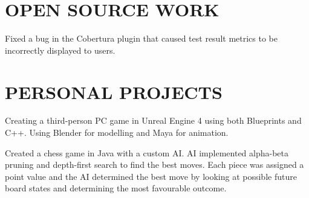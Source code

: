 \documentclass[letterpaper]{deedy-resume-modified} %
\begin{document}
\begin{minipage}[t]{0.66\textwidth}
\section{OPEN SOURCE WORK}


Fixed a bug in the Cobertura plugin that caused test result metrics to be incorrectly displayed to users.

\sectionspace %



\vspace{-8pt}
\section{PERSONAL PROJECTS}


Creating a third-person PC game in Unreal Engine 4 using both Blueprints and C++.  Using Blender for modelling and Maya for animation.

\sectionspace %



Created a chess game in Java with a custom AI.   AI implemented alpha-beta pruning and depth-first search to find the best moves.  Each piece was assigned a point value and the AI determined the best move by looking at possible future board states and determining the most favourable outcome.


\sectionspace %

\end{minipage} %

\end{document}
